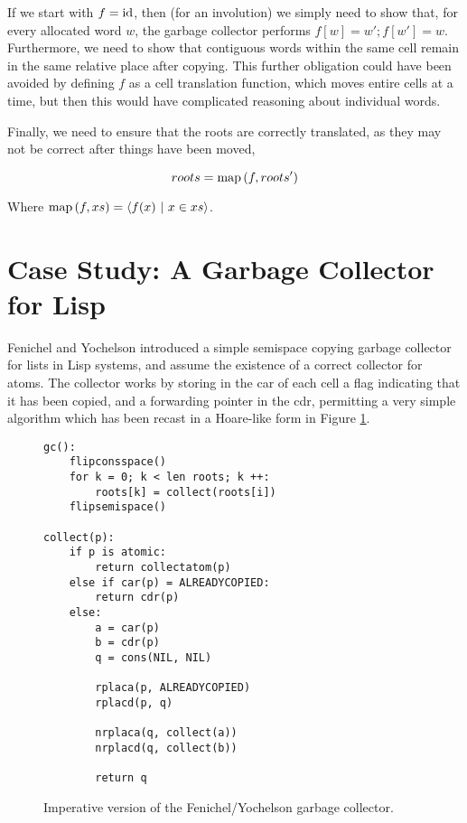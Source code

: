 If we start with $f = \mathrm{id}$, then (for an involution) we simply need to
show that, for every allocated word $w$, the garbage collector
performs $f[w] = w'; f[w'] = w$. Furthermore, we need to show that
contiguous words within the same cell remain in the same relative
place after copying. This further obligation could have been avoided
by defining $f$ as a cell translation function, which moves entire
cells at a time, but then this would have complicated reasoning about
individual words.

Finally, we need to ensure that the roots are correctly translated, as
they may not be correct after things have been moved,

\begin{definition}
  \label{def:c-root-translation}
  \[roots = \mathrm{map}\left(f, roots'\right)\]

  Where $\mathrm{map}\left(f, xs\right) = \langle f(x)~|~x \in xs \rangle$.
\end{definition}

\section{Case Study: A Garbage Collector for Lisp}
\label{sec:copying-example}

Fenichel and Yochelson\cite{Fenichel69} introduced a simple semispace
copying garbage collector for lists in Lisp systems, and assume the
existence of a correct collector for atoms. The collector works by
storing in the car of each cell a flag indicating that it has been
copied, and a forwarding pointer in the cdr, permitting a very simple
algorithm which has been recast in a Hoare-like form in Figure
\ref{fig:copying-example-algo}.

\begin{figure}[t]
  \centering
  \begin{lstlisting}
gc():
    flipconsspace()
    for k = 0; k < len roots; k ++:
        roots[k] = collect(roots[i])
    flipsemispace()

collect(p):
    if p is atomic:
        return collectatom(p)
    else if car(p) = ALREADYCOPIED:
        return cdr(p)
    else:
        a = car(p)
        b = cdr(p)
        q = cons(NIL, NIL)

        rplaca(p, ALREADYCOPIED)
        rplacd(p, q)

        nrplaca(q, collect(a))
        nrplacd(q, collect(b))

        return q
  \end{lstlisting}
  \caption{Imperative version of the Fenichel/Yochelson garbage collector.}
  \label{fig:copying-example-algo}
\end{figure}

